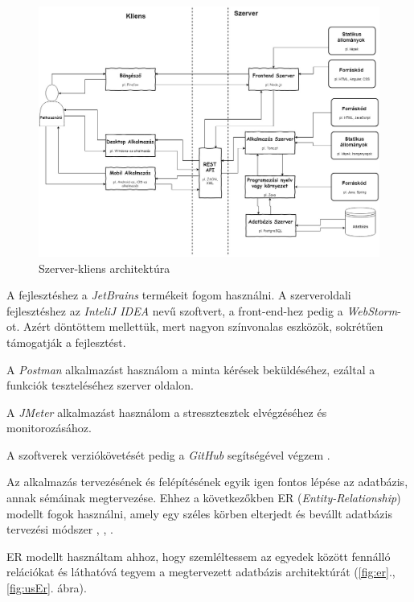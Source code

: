 \begin{figure}[h!]
\centering
\includegraphics[scale=0.365]{kepek/architecture.jpg}
\caption{Szerver-kliens architektúra}
\label{fig:architecture}
\end{figure}


A fejlesztéshez a \textit{JetBrains} termékeit fogom használni. A szerveroldali fejlesztéshez az \textit{InteliJ IDEA} nevű szoftvert, a front-end-hez pedig a \textit{WebStorm}-ot. Azért döntöttem mellettük, mert nagyon színvonalas eszközök, sokrétűen támogatják a fejlesztést.
 
A \textit{Postman} alkalmazást használom a minta kérések beküldéséhez, ezáltal a funkciók teszteléséhez szerver oldalon.

A \textit{JMeter} alkalmazást használom a stressztesztek elvégzéséhez és monitorozásához.

A szoftverek verziókövetését pedig a \textit{GitHub} segítségével végzem \cite{5}.


Az alkalmazás tervezésének és felépítésének egyik igen fontos lépése az adatbázis, annak sémáinak megtervezése. Ehhez a következőkben ER (\textit{Entity-Relationship}) modellt fogok használni, amely egy széles körben elterjedt és bevállt adatbázis tervezési módszer \cite{11}, \cite{12}, \cite{13}.


ER modellt használtam ahhoz, hogy szemléltessem az egyedek között fennálló relációkat és láthatóvá tegyem a megtervezett adatbázis architektúrát (\ref{fig:er}., \ref{fig:usEr}. ábra).

